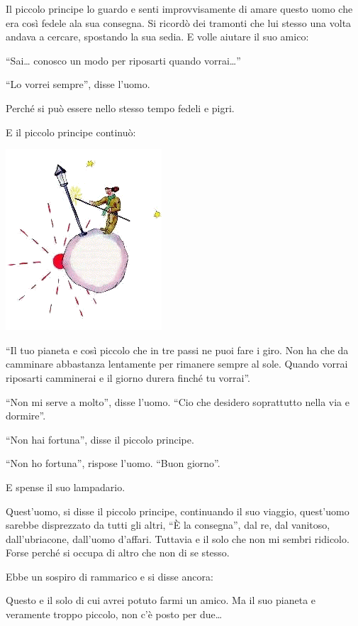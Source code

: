 \documentclass[11pt]{scrbook}
\begin{document}
Il piccolo principe lo guardo e senti improvvisamente di amare questo
uomo che era così fedele ala sua consegna. Si ricordò dei tramonti che
lui stesso una volta andava a cercare, spostando la sua sedia. E volle
aiutare il suo amico:

``Sai\ldots{} conosco un modo per riposarti quando vorrai\ldots{}''

``Lo vorrei sempre'', disse l'uomo.

Perché si può essere nello stesso tempo fedeli e pigri.

E il piccolo principe continuò:

\begin{center}
\includegraphics{img/14a}
\end{center}

``Il tuo pianeta e così piccolo che in tre passi ne puoi fare i giro.
Non ha che da camminare abbastanza lentamente per rimanere sempre al
sole. Quando vorrai riposarti camminerai e il giorno durera finché tu
vorrai''.

``Non mi serve a molto'', disse l'uomo. ``Cio che desidero soprattutto
nella via e dormire''.

``Non hai fortuna'', disse il piccolo principe.

``Non ho fortuna'', rispose l'uomo. ``Buon giorno''.

E spense il suo lampadario.

Quest'uomo, si disse il piccolo principe, continuando il suo viaggio,
quest'uomo sarebbe disprezzato da tutti gli altri, ``È la consegna'',
dal re, dal vanitoso, dall'ubriacone, dall'uomo d'affari. Tuttavia e il
solo che non mi sembri ridicolo. Forse perché si occupa di altro che non
di se stesso.

Ebbe un sospiro di rammarico e si disse ancora:

Questo e il solo di cui avrei potuto farmi un amico. Ma il suo pianeta e
veramente troppo piccolo, non c'è posto per due\ldots{}
\end{document}
